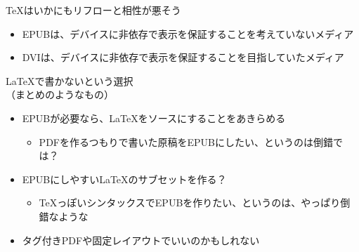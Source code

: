 \begin{frame}[t]{\inhibitglue \TeX はいかにもリフローと相性が悪そう}
  \sffamily

  \begin{itemize}
    \item EPUBは、デバイスに非依存で表示を保証することを考えていないメディア
    \item DVIは、デバイスに非依存で表示を保証することを目指していたメディア
  \end{itemize}

\end{frame}

\begin{frame}[t]{\inhibitglue \LaTeX{}で書かないという選択\\ （まとめのようなもの）}
  \sffamily

  \begin{itemize}
    \item EPUBが必要なら、\LaTeX{}をソースにすることをあきらめる\\
    \begin{itemize}
      \item PDFを作るつもりで書いた原稿をEPUBにしたい、というのは倒錯では？
    \end{itemize}
    \item EPUBにしやすい\LaTeX{}のサブセットを作る？
    \begin{itemize}
      \item \TeX{}っぽいシンタックスでEPUBを作りたい、というのは、やっぱり倒錯なような
    \end{itemize}
    \item タグ付きPDFや固定レイアウトでいいのかもしれない
  \end{itemize}
\end{frame} 


